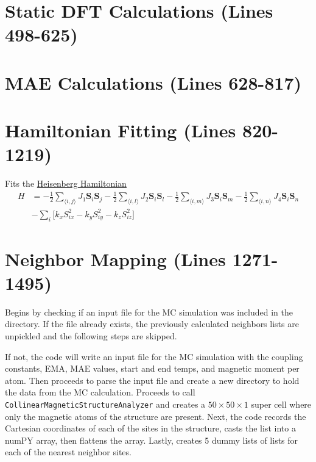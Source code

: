 \documentclass[12pt]{article}
\newcommand{\pmint}[1]{\texttt{#1}}
\begin{document}

\section*{Static DFT Calculations (Lines 498-625)} %

\section*{MAE Calculations (Lines 628-817) } %

\section*{Hamiltonian Fitting (Lines 820-1219)} %

Fits the \href{https://en.wikipedia.org/wiki/Quantum_Heisenberg_model}{Heisenberg Hamiltonian} 
\begin{align*}
    H &= -\frac{1}{2}\sum_{\langle i,j\rangle } J_1\textbf{S}_i\textbf{S}_j-\frac{1}{2}\sum_{\langle i,l\rangle} J_2\textbf{S}_i\textbf{S}_l-\frac{1}{2}\sum_{\langle i,m\rangle} J_3\textbf{S}_i\textbf{S}_m-\frac{1}{2}\sum_{\langle i,n\rangle} J_4\textbf{S}_i\textbf{S}_n \\
    &- \sum_i\Big[ k_xS_{ix}^2 - k_y S_{iy}^2- k_z S_{iz}^2\Big]
\end{align*}
 
\section*{Neighbor Mapping (Lines 1271-1495)} %
Begins by checking if an input file for the MC simulation was included in the directory. If the file already exists, the previously calculated neighbors lists are unpickled and the following steps are skipped. 

If not, the code will write an input file for the MC simulation with the coupling constants, EMA, MAE values, start and end temps, and magnetic moment per atom. Then proceeds to parse the input file and create a new directory to hold the data from the MC calculation. Proceeds to call \pmint{CollinearMagneticStructureAnalyzer} and creates a $50 \times 50 \times 1$ super cell where only the magnetic atoms of the structure are present. Next, the code records the Cartesian coordinates of each of the sites in the structure, casts the list into a numPY array, then flattens the array. Lastly, creates 5 dummy lists of lists for each of the nearest neighbor sites. 
\end{document}
